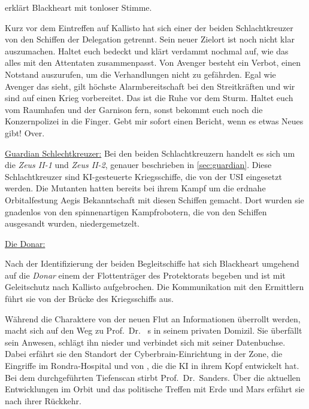 erklärt Blackheart mit tonloser Stimme. 

\begin{speech}
	Kurz vor dem Eintreffen auf Kallisto hat sich einer der beiden Schlachtkreuzer von den Schiffen der Delegation getrennt. Sein neuer Zielort ist noch nicht klar auszumachen. Haltet euch bedeckt und klärt verdammt nochmal auf, wie das alles mit den Attentaten zusammenpasst. Von Avenger besteht ein Verbot, einen Notstand auszurufen, um die Verhandlungen nicht zu gefährden. Egal wie Avenger das sieht, gilt höchste Alarmbereitschaft bei den Streitkräften und wir sind auf einen Krieg vorbereitet. Das ist die Ruhe vor dem Sturm. Haltet euch vom Raumhafen und der Garnison fern, sonst bekommt euch noch die Konzernpolizei in die Finger. Gebt mir sofort einen Bericht, wenn es etwas Neues gibt! Over.
\end{speech}

\begin{remarks}
	\underline{Guardian Schlechtkreuzer:}
	Bei den beiden Schlachtkreuzern handelt es sich um die \emph{Zeus II-1} und \emph{Zeus II-2}, genauer beschrieben in \cref{sec:guardian}. Diese Schlachtkreuzer sind KI-gesteuerte Kriegsschiffe, die von der USI eingesetzt werden. Die Mutanten hatten bereits bei ihrem Kampf um die erdnahe Orbitalfestung Aegis Bekanntschaft mit diesen Schiffen gemacht. Dort wurden sie gnadenlos von den spinnenartigen Kampfrobotern, die von den Schiffen ausgesandt wurden, niedergemetzelt.

	\underline{Die Donar:}

	Nach der Identifizierung der beiden Begleitschiffe hat sich Blackheart umgehend auf die \emph{Donar} einem der Flottenträger des Protektorats begeben und ist mit Geleitschutz nach Kallisto aufgebrochen. Die Kommunikation mit den Ermittlern führt sie von der Brücke des Kriegsschiffs aus.
\end{remarks}


Während die Charaktere von der neuen Flut an Informationen überrollt werden, macht sich \xl{} auf den Weg zu Prof.~Dr.~	s in seinem privaten Domizil. Sie überfällt sein Anwesen, schlägt ihn nieder und verbindet sich mit seiner Datenbuchse. Dabei erfährt sie den Standort der Cyberbrain-Einrichtung in der Zone, die Eingriffe im Rondra-Hospital und von \ml{}, die die KI in ihrem Kopf entwickelt hat. Bei dem durchgeführten Tiefenscan stirbt Prof.~Dr.~Sanders. Über die aktuellen Entwicklungen im Orbit und das politische Treffen mit Erde und Mars erfährt sie nach ihrer Rückkehr.

